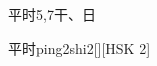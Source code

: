 \begin{entry}{平时}{5,7}{⼲、⽇}
  \begin{phonetics}{平时}{ping2shi2}[][HSK 2]
  \end{phonetics}
\end{entry}
